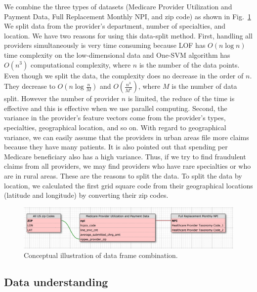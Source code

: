 \documentclass[dvipdfmx, english]{ampmt}             %
\newcommand{\Figref}[1]{Fig.~\ref{#1}}
\begin{document}
We combine the three types of datasets (Medicare Provider Utilization and Payment Data, Full Replacement Monthly NPI, and zip code) as shown in \Figref{fig:datacomb}
We split data from the provider’s{} department, number of specialties, and location. We have two reasons for using this data-split method. First, handling all providers simultaneously is very time consuming because LOF has $O(n\log n)$ time complexity
on the low\--dimensional data and One-SVM algorithm has $O(n^3)$ computational complexity, where $n$ is the number of the data points. Even though we split the data, the complexity does no decrease in the order of $n$. They decrease to $O(n\log{\frac{n}{M}})$ and $O(\frac{n^{3}}{M^{2}})$, where $M$ is the number of data split. However the number of provider $n$ is limited, the reduce of the time is effective and this is effective when we use parallel computing. 
Second, the variance in the provider’s {} feature vectors come from the provider's {} types, specialties, geographical location, and so on. With regard to geographical variance, we can easily assume that the providers in urban areas file more claims because they have many patients. It is also pointed out that spending per Medicare beneficiary also has a high variance\cite{GeoHealth}. Thus, if we try to find fraudulent claims from all providers, we may find providers who have rare specialties or who are in rural areas. These are the reasons to split the data. To split the data by location, we calculated the first grid square code \cite{ASato} from their geographical locations (latitude and longitude) by converting their zip codes.

\begin{figure}[H]
\centerline{\includegraphics[scale=.8]{../img/datacomb.png}}
\caption{Conceptual illustration of data frame combination.}
\label{fig:datacomb}
\end{figure}

\subsection{Data understanding}\label{sec:data-undestanding}
\end{document}
